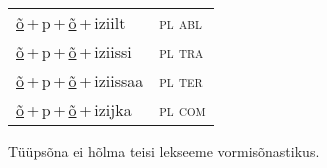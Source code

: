 \begin{minipage}{\textwidth}
\begin{sideways}
\begin{tabular}{l l}
\underline{õ}\,+\,p\,+\,\underline{õ}\,+\,iziilt & \textsc{ pl abl } \\
\underline{õ}\,+\,p\,+\,\underline{õ}\,+\,iziissi & \textsc{ pl tra } \\
\underline{õ}\,+\,p\,+\,\underline{õ}\,+\,iziissaa & \textsc{ pl ter } \\
\underline{õ}\,+\,p\,+\,\underline{õ}\,+\,izijka & \textsc{ pl com } \\
\end{tabular}
\end{sideways}
\label{tab:tüüpsõnamall-õpõin}

\end{minipage}

 
\vspace{1em}
\noindent Tüüpsõna ei hõlma teisi lekseeme vormi\-sõnastikus.
